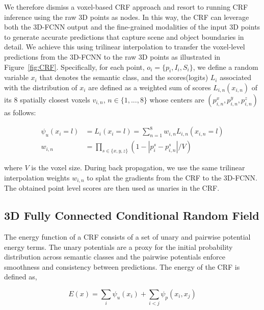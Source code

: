\documentclass[10pt,twocolumn,letterpaper]{article}
\newcommand{\fccrf}[0]{CRF\xspace}
\newcommand{\threedfcnn}[0]{3D-FCNN\xspace}
\begin{document}
We therefore dismiss a voxel-based CRF approach and resort to running \fccrf inference using the raw 3D points as nodes. In this way, the CRF can leverage both the \threedfcnn output and the fine-grained modalities of the input 3D points to generate accurate predictions that capture scene and object boundaries in detail. We achieve this using trilinear interpolation to transfer the voxel-level predictions from the \threedfcnn to the raw 3D points as illustrated in Figure~\ref{fig:CRF}. Specifically, for each point, $o_i = \{p_i, I_i, S_i\}$, we define a random variable $x_i$ that denotes the semantic class, and the scores(logits) $L_i$ associated with the distribution of $x_i$ are defined as a weighted sum of scores $L_{i,n}(x_{i,n})$ of its 8 spatially closest voxels $v_{i,n}$, $n\in\{1,..., 8\}$ whose centers are $(p_{i,n}^x, p_{i,n}^y, p_{i,n}^z)$ as follows:
\vspace{-2mm}
\begin{ceqn}\label{eq:unary}
\begin{align} 
    \psi_u(x_i = l) & =  L_i(x_i = l) =  \sum_{n=1}^{8}w_{i,n} L_{i,n}(x_{i,n} = l) \\
    w_{i,n} & = \prod_{s \in \{x, y, z\}} \left( 1 - |p_i^s-p_{i,n}^s|/V \right) \nonumber
\end{align}
\end{ceqn}

where $V$ is the voxel size. During back propagation, we use the same trilinear interpolation weights $w_{i,n}$ to splat the gradients from the \fccrf to the \threedfcnn. The obtained point level scores are then used as unaries in the CRF.


\subsection{3D Fully Connected Conditional Random Field} \label{sec:crf}

The energy function of a \fccrf consists of a set of unary and pairwise potential energy terms. The unary potentials are a proxy for the initial probability distribution across semantic classes and the pairwise potentials enforce smoothness and consistency between predictions.
The energy of the \fccrf is defined as,

\begin{equation} \label{eq:crf}
    E(x) = \sum_{i}\psi_u(x_{i}) + \sum_{i<j}\psi_p(x_i,x_j)
\end{equation}
\end{document}
